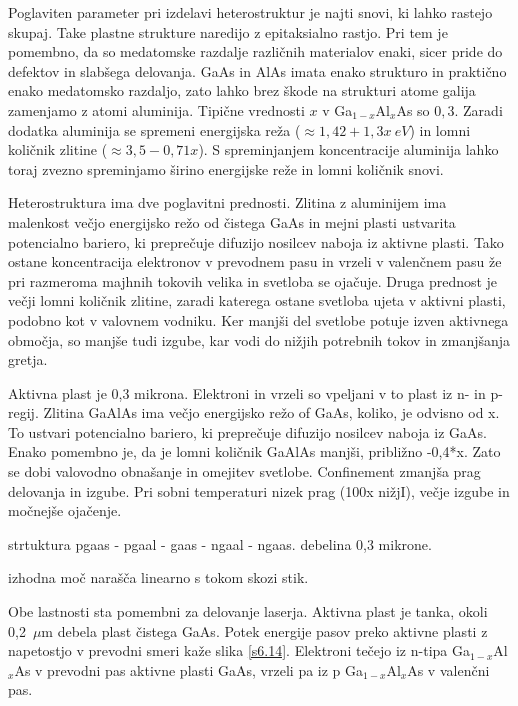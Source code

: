 \begin{remark}
Poglaviten parameter pri izdelavi heterostruktur je  najti snovi, ki lahko rastejo skupaj.
Take plastne strukture naredijo z epitaksialno rastjo. Pri tem je pomembno, da so medatomske
razdalje različnih materialov enaki, sicer pride do defektov in slabšega delovanja. 
GaAs in AlAs imata enako strukturo in praktično enako medatomsko razdaljo, zato 
lahko brez škode na strukturi atome galija zamenjamo z atomi aluminija. Tipične 
vrednosti $x$ v Ga$_{1-x}$Al$_x$As so $0,3$. Zaradi dodatka aluminija se spremeni energijska
reža ($\approx 1,42 + 1,3x~\si{eV}$) in lomni količnik zlitine ($\approx 3,5-0,71x$). S 
spreminjanjem koncentracije aluminija lahko toraj zvezno spreminjamo širino 
energijske reže in lomni količnik snovi. 
\end{remark}

Heterostruktura ima dve poglavitni prednosti. Zlitina z aluminijem ima malenkost večjo 
energijsko režo od čistega GaAs in mejni plasti ustvarita potencialno bariero, 
ki preprečuje difuzijo nosilcev naboja iz aktivne plasti. Tako ostane koncentracija 
elektronov v prevodnem pasu in vrzeli v valenčnem pasu že pri razmeroma majhnih tokovih
velika in svetloba se ojačuje. Druga prednost je večji lomni količnik zlitine, 
zaradi katerega ostane svetloba ujeta v aktivni plasti, podobno kot v valovnem 
vodniku. Ker manjši del svetlobe potuje izven aktivnega območja, so manjše tudi izgube, 
kar vodi do nižjih potrebnih tokov in zmanjšanja gretja.  




Aktivna plast je 0,3 mikrona. Elektroni in vrzeli so vpeljani v to plast iz n- in p-
regij. Zlitina GaAlAs ima večjo energijsko režo of GaAs, koliko, je odvisno od x.
To ustvari potencialno bariero, ki preprečuje difuzijo nosilcev naboja iz GaAs.
Enako pomembno je, da je lomni količnik GaAlAs manjši, približno -0,4*x. Zato 
se dobi valovodno obnašanje in omejitev svetlobe. Confinement zmanjša prag delovanja in izgube.
Pri sobni temperaturi nizek prag (100x nižjI), večje izgube in močnejše ojačenje.

strtuktura pgaas - pgaal - gaas - ngaal - ngaas. debelina 0,3 mikrone. 


izhodna moč narašča linearno s tokom skozi stik. 

Obe lastnosti sta pomembni za delovanje laserja. Aktivna plast je tanka,
okoli 0,2~$\mu$m debela plast čistega GaAs. Potek energije pasov preko
aktivne plasti z napetostjo v prevodni smeri kaže slika \ref{s6.14}.
Elektroni tečejo iz n-tipa Ga$_{1-x}$Al$_x$As v prevodni pas aktivne plasti
GaAs, vrzeli pa iz p Ga$_{1-x}$Al$_x$As v valenčni pas. 


